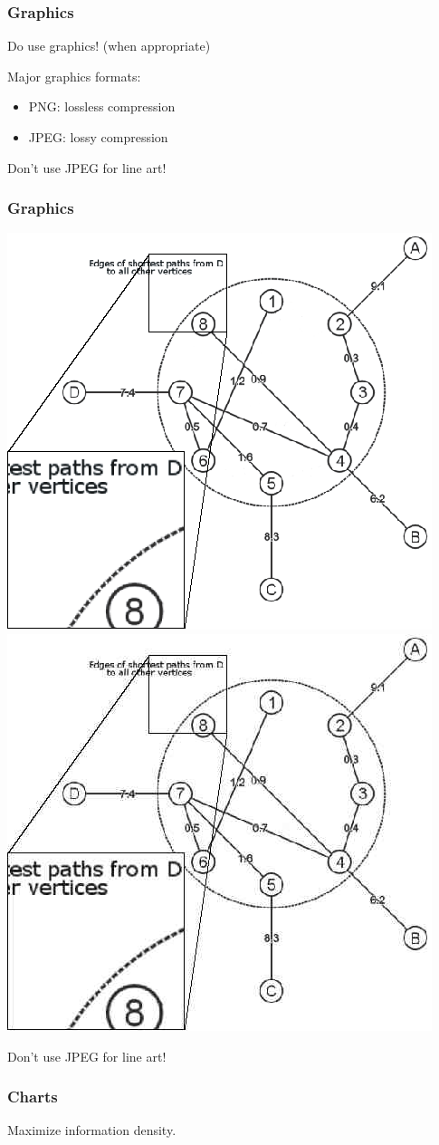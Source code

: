 \documentclass{beamer}
\begin{document}
\begin{frame}

\frametitle{Graphics}

\begin{center}
Do use graphics! (when appropriate)
\end{center}

Major graphics formats:

\begin{itemize}
\item PNG: lossless compression
\item JPEG: lossy compression
\end{itemize}

\alert{Don't use JPEG for line art!}

\end{frame}

\begin{frame}

\frametitle{Graphics}

\begin{center}
\includegraphics[width=.4\textwidth]{detail.png} \includegraphics[width=.4\textwidth]{detail.jpg}
\end{center}

\alert{Don't use JPEG for line art!}

\end{frame}

\begin{frame}

\frametitle{Charts}

{ \Large
\begin{center}
Maximize information density.
\end{center}
}

\end{frame}
\end{document}
